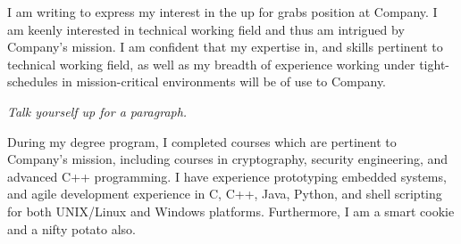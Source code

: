 \documentclass[10pt]{memoir}
\newcommand{\company}{Company}
\newcommand{\position}{up for grabs}
\newcommand{\workingfield}{technical working field}
\newcommand{\perks}{a smart cookie and a nifty potato also}
\newcommand{\courses}{cryptography, security engineering, and advanced C++ programming}
\newcommand{\experience}{prototyping embedded systems}
\newcommand{\proglangs}{C, C++, Java, Python, and shell scripting for both UNIX/Linux and Windows platforms}
\begin{document}
\address{}
\opening{}

  I am writing to express my interest in the \position{} 
  position at \company{}\postingsource{}.  I am keenly 
  interested in \workingfield{} and thus am intrigued by 
  \company{}'s mission. I am confident that my expertise in, 
  and skills pertinent to \workingfield{}, as well as my 
  breadth of experience working under tight-schedules in 
  mission-critical environments will be of use to \company{}.

  \textit{Talk yourself up for a paragraph.}
  \lipsum[8]

  During my degree program, I completed courses which are 
  pertinent to \company{}'s mission, including courses in
  \courses{}. I have experience \experience{}, and agile 
  development experience in \proglangs{}.  Furthermore, I am 
  \perks{}.
  
\closing{}
\end{document}

